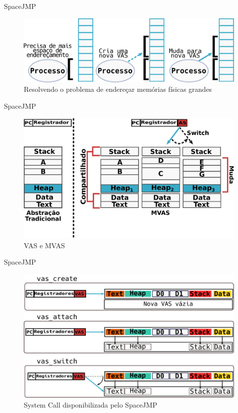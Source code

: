 \documentclass[xcolor={usenames,svgnames,dvipsnames},brazil,english,12pt,aspectratio=149]{beamer}
\begin{document}
\begin{frame}{SpaceJMP}
	\begin{figure}[!h]
		\centering
		\includegraphics[width=.7\textwidth]{solve_huge_address_memory}
		\caption{Resolvendo o problema de endereçar memórias físicas grandes}
		\label{fig:large_memory}
	\end{figure}
\end{frame}

\begin{frame}{SpaceJMP}
	\begin{figure}[!h]
		\centering
		\includegraphics[width=.7\textwidth]{traditional_vs_mvas} 
		\caption{VAS e MVAS}
		\label{fig:traditional_vs_mvas} 
	\end{figure}
\end{frame}

\begin{frame}{SpaceJMP}
	\begin{figure}[!h]
		\centering
		\includegraphics[width=.7\textwidth]{mvas_example} 
		\caption{System Call disponibilizada pelo SpaceJMP}
		\label{fig:mvas_example}
	\end{figure}
\end{frame}
\end{document}
